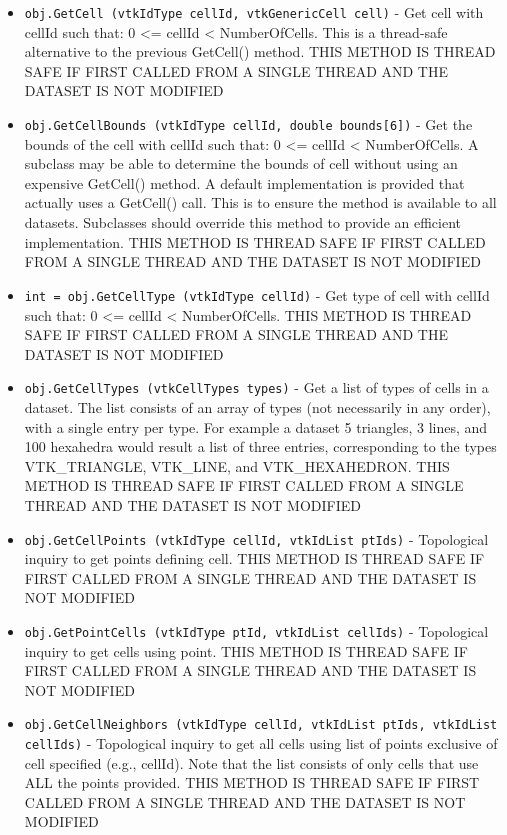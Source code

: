 \begin{itemize}
\item  \verb|obj.GetCell (vtkIdType cellId, vtkGenericCell cell)| -  Get cell with cellId such that: 0 <= cellId < NumberOfCells. 
 This is a thread-safe alternative to the previous GetCell()
 method.
 THIS METHOD IS THREAD SAFE IF FIRST CALLED FROM A SINGLE THREAD AND
 THE DATASET IS NOT MODIFIED

\item  \verb|obj.GetCellBounds (vtkIdType cellId, double bounds[6])| -  Get the bounds of the cell with cellId such that:
     0 <= cellId < NumberOfCells.
 A subclass may be able to determine the bounds of cell without using
 an expensive GetCell() method. A default implementation is provided
 that actually uses a GetCell() call.  This is to ensure the method
 is available to all datasets.  Subclasses should override this method
 to provide an efficient implementation.
 THIS METHOD IS THREAD SAFE IF FIRST CALLED FROM A SINGLE THREAD AND
 THE DATASET IS NOT MODIFIED

\item  \verb|int = obj.GetCellType (vtkIdType cellId)| -  Get type of cell with cellId such that: 0 <= cellId < NumberOfCells.
 THIS METHOD IS THREAD SAFE IF FIRST CALLED FROM A SINGLE THREAD AND
 THE DATASET IS NOT MODIFIED

\item  \verb|obj.GetCellTypes (vtkCellTypes types)| -  Get a list of types of cells in a dataset. The list consists of an array
 of types (not necessarily in any order), with a single entry per type.
 For example a dataset 5 triangles, 3 lines, and 100 hexahedra would
 result a list of three entries, corresponding to the types VTK\_TRIANGLE,
 VTK\_LINE, and VTK\_HEXAHEDRON.
 THIS METHOD IS THREAD SAFE IF FIRST CALLED FROM A SINGLE THREAD AND
 THE DATASET IS NOT MODIFIED

\item  \verb|obj.GetCellPoints (vtkIdType cellId, vtkIdList ptIds)| -  Topological inquiry to get points defining cell.
 THIS METHOD IS THREAD SAFE IF FIRST CALLED FROM A SINGLE THREAD AND
 THE DATASET IS NOT MODIFIED

\item  \verb|obj.GetPointCells (vtkIdType ptId, vtkIdList cellIds)| -  Topological inquiry to get cells using point.
 THIS METHOD IS THREAD SAFE IF FIRST CALLED FROM A SINGLE THREAD AND
 THE DATASET IS NOT MODIFIED

\item  \verb|obj.GetCellNeighbors (vtkIdType cellId, vtkIdList ptIds, vtkIdList cellIds)| -  Topological inquiry to get all cells using list of points exclusive of
 cell specified (e.g., cellId). Note that the list consists of only
 cells that use ALL the points provided.
 THIS METHOD IS THREAD SAFE IF FIRST CALLED FROM A SINGLE THREAD AND
 THE DATASET IS NOT MODIFIED


\end{itemize}
